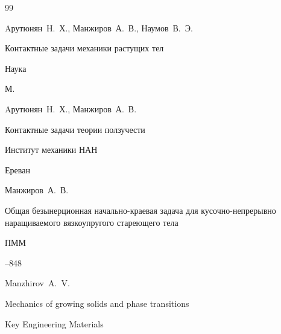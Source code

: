 \begin{thebibliography}{99}

  


\by Aрутюнян~Н.~Х., Манжиров~А.~В., Наумов~В.~Э.

\book Контактные задачи механики растущих тел


\publ Наука

\publaddr М.





\by Aрутюнян~Н.~Х., Манжиров~А.~В.

\book Контактные задачи теории ползучести


\publ Институт механики НАН

\publaddr Ереван





\by Манжиров~А.~В.

\paper Общая безынерционная начально-краевая задача для кусочно-непрерывно наращиваемого вязкоупругого стареющего тела

\jour ПММ




--848












\by Manzhirov~A.~V.

\paper Mechanics of growing solids and phase transitions

\jour Key Engineering Materials


\end{thebibliography}
